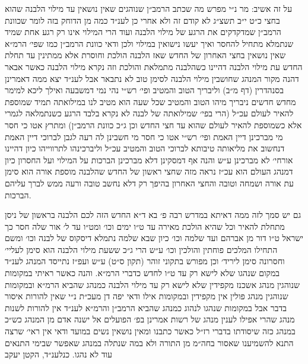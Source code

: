 \documentclass[12pt, openany]{book}
\begin{document}
\begin{multicols}{2}
על זה אשיב: מר נ״י מפרש מה שכתב הרמב״ן שנוהגים שאין נושאין עד מילוי הלבנה שהוא בחצי כ״ט י״ב תשצ״ג לא קודם זה ולא אחרי כן לענ״ד כמה מן הדוחק בזה לומר שכוונת הרמב״ן שמדקדקים את הרגע של מילוי הלבנה ועוד הרי המילוי אינו רק רגע אחת שמיד שנתמלא מתחיל להחסר ואיך יעשו נישואין במילוי ולכן ודאי כוונת הרמב״ן כמו שפי׳ הרמ״א שאין נושאין בחצי האחרון של החדש שאז הלבנה הולכת וחוסרת אלא ממתינין עד תחלת החדש עת מילוי הלבנה דהיינו כשהלבנה מתמלאת והולכת וזה נקרא מילוי הלבנה כאשר אבאר דהנה מקור המנהג שחושבין מילוי הלבנה לסימן טוב לא נתבאר אבל לענ״ד יצא ממה דאמרינן בסנהדרין (דף מ״ב) וליבריך הטוב והמטיב ופי׳ רש״י נהי נמי דמשבעה ואילך ליכא למימר מחדש חדשים ניבריך מיהו הטוב והמטיב שכל שעה הוא מטיב לנו במילואתה תמיד שמוספת להאיר לעולם עכ״ל (הרי בפי׳ שמילואתה של לבנה לא נקרא בלבד הרגע כשנתמלאה לגמרי אלא כשמוספת להאיר לעולם שהוא עד חצי החדש וכן ג״כ כוונת הרמב״ן) ומתרץ אטו כי חסר מי מברכינן דיין האמת ופי׳ רש״י אטו כי חסר מי חשבינן לה רעה לגבן לברוכי דיין האמת דנחשוב את מליאותה טיבותא לברוכי הטוב והמטיב עכ״ל וליברכינהו לתרווייהו כיון דהיינו אורחי׳ לא מברכינן ע״ש והנה אף דמסקינן דלא מברכינן הברכות על המילוי ועל החסרון כיון דמנהג העולם הוא עכ״ז נראה מזה שחצי ראשון של החדש שהלבנה מוספת אורה הוא סימן עת אורה ושמחה וטובה והחצי האחרון בהיפך רק דלא נחשב טובה ורעה ממש לברך עליהם הברכות.\\\vspace{0pt}

גם יש סמך לזה ממה דאיתא במדרש רבה פ׳ בא ד״א החדש הזה לכם הלבנה בראשון של ניסן מתחלת להאיר וכל שהיא הולכת מאירה עד ט״ו ימים וכו׳ ומט״ו עד ל׳ אור שלה חסר כך ישראל ט״ו דור מן אברהם ועד שלמה וכו׳ כיון שבא שלמה נתמלא דיסקוס של לבנה וכו׳ ומשם התחילו המלכים פוחתין והולכין וכו׳ ע״ש הרי ג״כ ששעת מילוי הלבנה הוא סימן לעליי׳ וחסרונה סימן ליריד׳ וכן מפורש בתקוני זוהר (תקון ס״ט) ע״ש ועפ״ז נתייסד המנהג לענ״ד במקום שנהגו שלא לישא רק עד ט״ו לחדש כדברי הרמ״א. והנה כאשר ראיתי במקומות שנוהגין מנהג אשכנז מקפידין שלא לישא רק עד מילוי הלבנה כמנהג שהביא הרמ״א ובמקומות שנוהגין מנהג פולין אין מקפידין ובמקומות אילו ודאי יפה דן מעכ״ת נ״י שאין להורות איסור בדבר אבל במקומות שנהגו לנהוג כמנהג שהביא הרמב״ן והרמ״א לענ״ד אין להורות לשנות מנהג שהרי אפילו לענין מנהג של רשות אמרינן בפ׳ הפועלים אל ישנה אדם מן המנהג כש״כ במנהג כזה שיסודתו בדברי רז״ל כאשר כתבנו ומאין נושאין נשים במועד ודאי אין ראי׳ שרצה התנא להשמיענו שאסור בחה״מ מן התורה ולא במה שנתלה במנהג שאפשר שבימי התנאים עוד לא נהגו. כנלענ״ד, הקטן יעקב\\\vspace{0pt}

\end{multicols}\newpage
\end{document}
